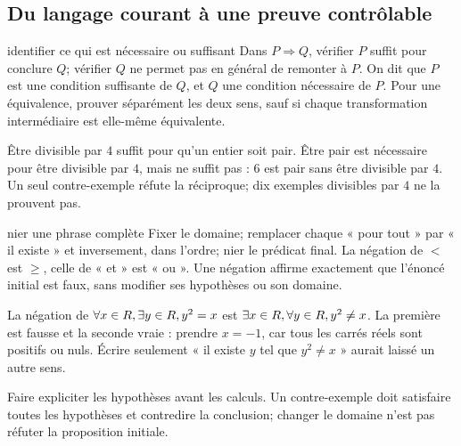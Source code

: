 \subsection*{Du langage courant à une preuve contrôlable}
\begin{methode}{identifier ce qui est nécessaire ou suffisant}
Dans $P\Rightarrow Q$, vérifier $P$ suffit pour conclure $Q$; vérifier $Q$ ne permet pas en général de remonter à $P$. On dit que $P$ est une condition suffisante de $Q$, et $Q$ une condition nécessaire de $P$. Pour une équivalence, prouver séparément les deux sens, sauf si chaque transformation intermédiaire est elle-même équivalente.
\end{methode}
\begin{exemple}
Être divisible par $4$ suffit pour qu’un entier soit pair. Être pair est nécessaire pour être divisible par $4$, mais ne suffit pas : $6$ est pair sans être divisible par $4$. Un seul contre-exemple réfute la réciproque; dix exemples divisibles par $4$ ne la prouvent pas.
\end{exemple}
\begin{methode}{nier une phrase complète}
Fixer le domaine; remplacer chaque « pour tout » par « il existe » et inversement, dans l’ordre; nier le prédicat final. La négation de $<$ est $\ge$, celle de « et » est « ou ». Une négation affirme exactement que l’énoncé initial est faux, sans modifier ses hypothèses ou son domaine.
\end{methode}
\begin{exemple}
La négation de $\forall x\in R,\exists y\in R,y^2=x$ est $\exists x\in R,\forall y\in R,y^2\ne x$. La première est fausse et la seconde vraie : prendre $x=-1$, car tous les carrés réels sont positifs ou nuls. Écrire seulement « il existe $y$ tel que $y^2\ne x$ » aurait laissé un autre sens.
\end{exemple}
\begin{notepourlaclasse}Faire expliciter les hypothèses avant les calculs. Un contre-exemple doit satisfaire toutes les hypothèses et contredire la conclusion; changer le domaine n’est pas réfuter la proposition initiale.\end{notepourlaclasse}

